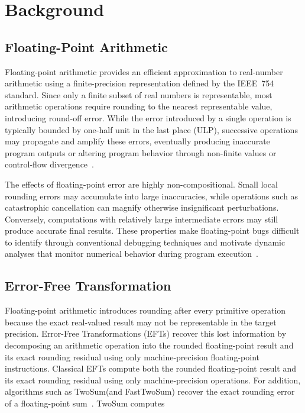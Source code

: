 \section{Background}
\label{sec:background}

\subsection{Floating-Point Arithmetic}
\label{sec:back_fp_arithmetic}

Floating-point arithmetic provides an efficient approximation to real-number arithmetic using a finite-precision representation defined by the IEEE~754 standard. Since only a finite subset of real numbers is representable, most arithmetic operations require rounding to the nearest representable value, introducing round-off error. While the error introduced by a single operation is typically bounded by one-half unit in the last place (ULP), successive operations may propagate and amplify these errors, eventually producing inaccurate program outputs or altering program behavior through non-finite values or control-flow divergence~\cite{ieee754,fptaylor}.

The effects of floating-point error are highly non-compositional. Small local rounding errors may accumulate into large inaccuracies, while operations such as catastrophic cancellation can magnify otherwise insignificant perturbations. Conversely, computations with relatively large intermediate errors may still produce accurate final results. These properties make floating-point bugs difficult to identify through conventional debugging techniques and motivate dynamic analyses that monitor numerical behavior during program execution~\cite{fpdebug,herbgrind,nsan}.

\subsection{Error-Free Transformation}
\label{sec:back_eft}

Floating-point arithmetic introduces rounding after every primitive operation because the exact real-valued result may not be representable in the target precision. Error-Free Transformations (EFTs) recover this lost information by decomposing an arithmetic operation into the rounded floating-point result and its exact rounding residual using only machine-precision floating-point instructions. Classical EFTs compute both the rounded floating-point result and its exact rounding residual using only machine-precision operations. For addition, algorithms such as TwoSum(and FastTwoSum) recover the exact rounding error of a floating-point sum~\cite{dekker}. TwoSum computes

